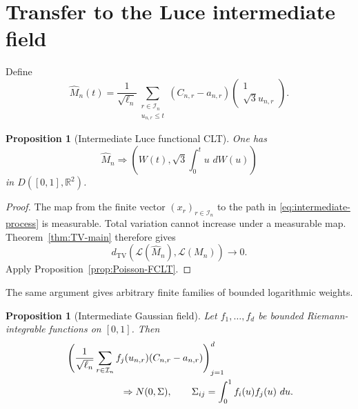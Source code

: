 \documentclass[11pt]{article}
\newtheorem{proposition}[theorem]{Proposition}
\theoremstyle{definition}
\theoremstyle{remark}
\newcommand{\dd}{\,d}
\newcommand{\TV}{\mathrm{TV}}
\newcommand{\cL}{\mathcal L}
\newcommand{\cI}{\mathcal I}
\newcommand{\R}{\mathbb R}
\begin{document}
\section{Transfer to the Luce intermediate field}

Define
\begin{equation}\label{eq:intermediate-process}
 \widehat M_n(t)=\frac1{\sqrt{\ell_n}}
 \sum_{\substack{r\in\cI_n\\u_{n,r}\le t}}
 (C_{n,r}-a_{n,r})
 \begin{pmatrix}1\\ \sqrt3u_{n,r}\end{pmatrix}.
\end{equation}

\begin{proposition}[Intermediate Luce functional CLT]
\label{prop:Luce-intermediate-FCLT}
One has
\begin{equation}\label{eq:Luce-intermediate-FCLT}
 \widehat M_n\Rightarrow
 \left(W(t),\sqrt3\int_0^t u\,\dd W(u)\right)
\end{equation}
in $D([0,1],\R^2)$.
\end{proposition}

\begin{proof}
The map from the finite vector $(x_r)_{r\in\cI_n}$ to the path in
\eqref{eq:intermediate-process} is measurable.  Total variation cannot
increase under a measurable map.  Theorem~\ref{thm:TV-main} therefore gives
\[
 d_{\TV}(\cL(\widehat M_n),\cL(M_n))\longrightarrow0.
\]
Apply Proposition~\ref{prop:Poisson-FCLT}.
\end{proof}

The same argument gives arbitrary finite families of bounded logarithmic
weights.

\begin{proposition}[Intermediate Gaussian field]
\label{prop:intermediate-field}
Let $f_1,\ldots,f_d$ be bounded Riemann-integrable functions on $[0,1]$.
Then
\begin{align}
 &\left(
 \frac1{\sqrt{\ell_n}}
 \sum_{r\in\cI_n}f_j(u_{n,r})(C_{n,r}-a_{n,r})
 \right)_{j=1}^d
 \notag\\
 &\hspace{2cm}\Rightarrow
 N(0,\Sigma),
 \qquad
 \Sigma_{ij}=\int_0^1f_i(u)f_j(u)\,\dd u.
 \label{eq:intermediate-field}
\end{align}
\end{proposition}
\end{document}
